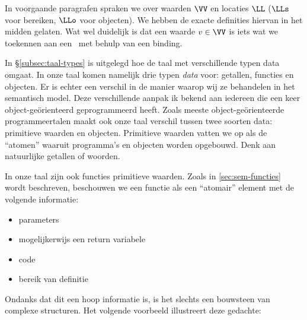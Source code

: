 In voorgaande paragrafen spraken we over waarden $\VV$ en locaties $\LL$ ($\LLs$ voor bereiken, $\LLo$ voor objecten). We hebben de exacte definities hiervan in het midden gelaten. Wat wel duidelijk is dat een waarde $v \in \VV$ is iets wat we toekennen aan een \Id\ met behulp van een binding.

In §\ref{subsec:taal-types} is uitgelegd hoe de taal met verschillende typen data omgaat. In onze taal komen namelijk drie typen \emph{data} voor: getallen, functies en objecten. Er is echter een verschil in de manier waarop wij ze behandelen in het semantisch model. Deze verschillende aanpak ik bekend aan iedereen die een keer object-geörienteerd geprogrammeerd heeft.
Zoals meeste object-geörienteerde programmeertalen maakt ook onze taal verschil tussen twee soorten data: primitieve waarden en objecten. Primitieve waarden vatten we op als de ``atomen'' waaruit programma's en objecten worden opgebouwd. Denk aan natuurlijke getallen of woorden.

\begin{NoBreak}
  \codeFragmentCaption
\end{NoBreak}

In onze taal zijn ook functies primitieve waarden. Zoals in \ref{sec:sem-functies} wordt beschreven, beschouwen we een functie als een ``atomair'' element met de volgende informatie:
\begin{itemize}
  \item parameters
  \item mogelijkerwijs een return variabele
  \item code
  \item bereik van definitie
\end{itemize}
Ondanks dat dit een hoop informatie is, is het slechts een bouwsteen van complexe structuren. Het volgende voorbeeld illustreert deze gedachte:

\begin{NoBreak}
  \codeFragmentCaption
\end{NoBreak}


